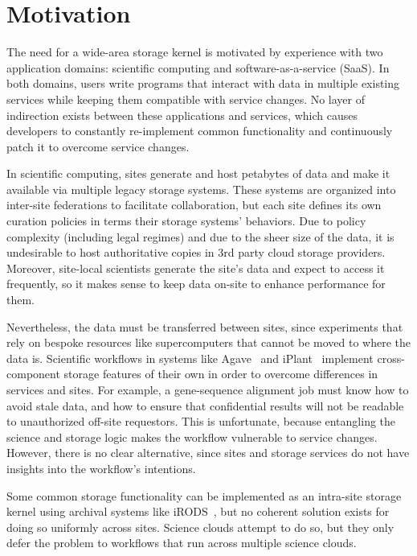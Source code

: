 \section{Motivation}
\label{sec:motivation}

The need for a wide-area storage kernel is motivated by experience with two application domains:
scientific computing and software-as-a-service (SaaS). In both domains, users
write programs that interact with data in multiple existing services while
keeping them compatible with service changes.  No layer of indirection exists
between these applications and services, which causes developers to constantly
re-implement common functionality and continuously patch it to overcome service
changes.

In scientific computing, sites generate and host petabytes of data and make it
available via multiple legacy storage systems.  These systems are organized
into inter-site federations to facilitate collaboration, but each site defines
its own curation policies in terms their storage systems' behaviors.  Due
to policy complexity (including legal regimes) and due to the sheer size
of the data, it is undesirable to host authoritative copies in 3rd
party cloud storage providers.  Moreover, site-local scientists generate the
site's data and expect to access it frequently, so it makes sense to
keep data on-site to enhance performance for them.

%

Nevertheless, the data must be transferred
between sites, since experiments that rely on bespoke resources like
supercomputers that cannot be moved to where the data is.
Scientific workflows in systems like Agave~\cite{agave} and iPlant~\cite{iplant}
implement cross-component storage features of their own in
order to overcome differences in services and sites.  For example, a
gene-sequence alignment job must know how to avoid stale data, and how to ensure
that confidential results will not be readable to unauthorized off-site
requestors. This is unfortunate, because entangling the science and storage
logic makes the workflow vulnerable to service changes.  However, there is no
clear alternative, since sites and storage services do not have insights into
the workflow's intentions.

Some common storage functionality can be implemented as an intra-site storage
kernel using archival systems like iRODS~\cite{irods}, but no
coherent solution exists for doing so uniformly across sites. Science clouds
attempt to do so, but they only defer the problem to workflows that run across
multiple science clouds.

